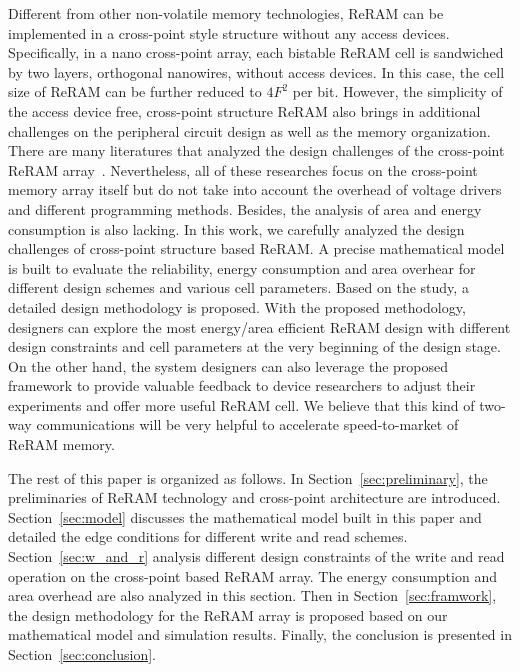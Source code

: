 Different from other non-volatile memory technologies, ReRAM can be implemented in a cross-point style structure without any access devices. Specifically, in a nano cross-point array, each bistable ReRAM cell is sandwiched by two layers, orthogonal nanowires, without access devices. In this case, the cell size of ReRAM can be further reduced to $4F^2$ per bit. However, the simplicity of the access device free, cross-point structure ReRAM also brings in additional challenges on the peripheral circuit design as well as the memory organization. There are many literatures that analyzed the design challenges of the cross-point ReRAM array~\cite{crossbar_NANO08_Flocke,crossbar_NANO2002_Ziegler,crossbar_NANO2003_Ziegler,crossbar_TED_2010}. Nevertheless, all of these researches focus on the cross-point memory array itself but do not take into account the overhead of voltage drivers and different programming methods. Besides, the analysis of area and energy consumption is also lacking. In this work, we carefully analyzed the design challenges of cross-point structure based ReRAM. A precise mathematical model is built to evaluate the reliability, energy consumption and area overhear for different design schemes and various cell parameters. Based on the study, a detailed design methodology is proposed. With the proposed methodology, designers can explore the most energy/area efficient ReRAM design with different design constraints and cell parameters at the very beginning of the design stage. On the other hand, the system designers can also leverage the proposed framework to provide valuable feedback to device researchers to adjust their experiments and offer more useful ReRAM cell. We believe that this kind of two-way communications will be very helpful to accelerate speed-to-market of ReRAM memory.

The rest of this paper is organized as follows. In
Section~\ref{sec:preliminary}, the preliminaries of ReRAM technology and cross-point architecture are introduced. Section~\ref{sec:model} discusses the mathematical model built in this paper and detailed the edge conditions for different write and read schemes. Section~\ref{sec:w_and_r} analysis different design constraints of the write and read operation on the cross-point based ReRAM array. The energy consumption and area overhead are also analyzed in this section. Then in Section~\ref{sec:framwork}, the design methodology for the ReRAM array is proposed based on our mathematical model and simulation results. Finally, the conclusion is presented in Section~\ref{sec:conclusion}. 